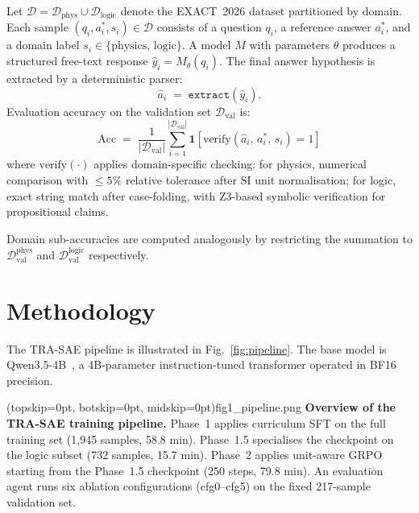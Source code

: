 \documentclass{ieeeaccess}
\newcommand{\modelname}{\textsc{TRA-SAE}}
\newcommand{\basemodelname}{Qwen3.5-4B}
\newcommand{\dataset}{EXACT~2026}
\begin{document}
Let $\mathcal{D} = \mathcal{D}_{\text{phys}} \cup \mathcal{D}_{\text{logic}}$
denote the \dataset{} dataset partitioned by domain.
Each sample $(q_i, a_i^*, s_i) \in \mathcal{D}$ consists of a question
$q_i$, a reference answer $a_i^*$, and a domain label
$s_i \in \{\text{physics},\,\text{logic}\}$.
A model $M$ with parameters $\theta$ produces a structured free-text
response $\hat{y}_i = M_\theta(q_i)$.
The final answer hypothesis is extracted by a deterministic parser:
\begin{equation}
  \hat{a}_i \;=\; \texttt{extract}\!\left(\hat{y}_i\right).
  \label{eq:extract}
\end{equation}
Evaluation accuracy on the validation set $\mathcal{D}_{\text{val}}$ is:
\begin{equation}
  \mathrm{Acc} \;=\; \frac{1}{|\mathcal{D}_{\text{val}}|}
  \sum_{i=1}^{|\mathcal{D}_{\text{val}}|}
  \mathbf{1}\!\left[
    \mathrm{verify}\!\left(\hat{a}_i,\, a_i^*,\, s_i\right) = 1
  \right]
  \label{eq:acc}
\end{equation}
where $\mathrm{verify}(\cdot)$ applies domain-specific checking:
for physics, numerical comparison with $\leq\!5\%$ relative tolerance
after SI unit normalisation; for logic, exact string match after
case-folding, with Z3-based symbolic verification for propositional
claims.

Domain sub-accuracies are computed analogously by restricting the
summation to $\mathcal{D}_{\text{val}}^{\text{phys}}$ and
$\mathcal{D}_{\text{val}}^{\text{logic}}$ respectively.

\section{Methodology}
\label{sec:method}

The \modelname{} pipeline is illustrated in Fig.~\ref{fig:pipeline}.
The base model is \basemodelname{}~\cite{b23}, a 4B-parameter
instruction-tuned transformer operated in BF16 precision.

\Figure[t!](topskip=0pt, botskip=0pt, midskip=0pt){fig1_pipeline.png}{%
  \textbf{Overview of the \modelname{} training pipeline.}
  Phase~1 applies curriculum SFT on the full training set (1,945 samples,
  58.8 min).
  Phase~1.5 specialises the checkpoint on the logic subset (732 samples,
  15.7 min).
  Phase~2 applies unit-aware GRPO starting from the Phase~1.5 checkpoint
  (250 steps, 79.8 min).
  An evaluation agent runs six ablation configurations (cfg0--cfg5) on the
  fixed 217-sample validation set.
  \label{fig:pipeline}}
\end{document}
